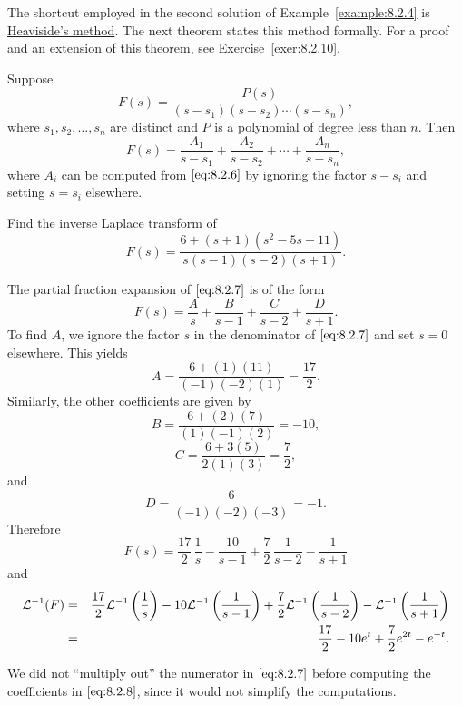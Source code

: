 \documentclass{ximera}
\begin{document}
The shortcut employed in the second solution of
Example~\ref{example:8.2.4} is
\href{https://en.wikipedia.org/wiki/Heaviside_cover-up_method}{Heaviside's method}.
The next theorem states this method formally.  For a proof
and an extension of this theorem, see Exercise~\ref{exer:8.2.10}.

\begin{theorem}\label{thmtype:8.2.2}
Suppose
\begin{equation}\label{eq:8.2.6}
F(s)=\frac{P(s)}{(s-s_1)(s-s_2)\cdots(s-s_n)},
\end{equation}
where $s_1, s_2, \dots, s_n$ are distinct  and $P$ is a polynomial of
degree less than $n$.  Then
$$
F(s)=\frac{A_1}{s-s_1}+\frac{A_2}{s-s_2}+\cdots+\frac{A_n}{s-s_n},$$
where $A_i$ can be computed from $\eqref{eq:8.2.6}$
by ignoring the factor $s-s_i$ and setting $s=s_i$ elsewhere.
\end{theorem}

\begin{example}\label{example:8.2.5} Find the inverse Laplace transform
of
\begin{equation}\label{eq:8.2.7}
F(s)=\frac{6+(s+1)(s^2-5s+11)}{s(s-1)(s-2)(s+1)}.
\end{equation}
\begin{explanation}
The partial fraction expansion of $\eqref{eq:8.2.7}$ is of the form
\begin{equation}\label{eq:8.2.8}
F(s)=\frac{A}{s}+\frac{B}{s-1}+\frac{C}{s-2}+\frac{D}{s+1}.
\end{equation}
To find $A$, we ignore the factor $s$ in the denominator of
$\eqref{eq:8.2.7}$ and set $s=0$ elsewhere. This yields
$$
A=\frac{6+(1)(11)}{(-1)(-2)(1)}=\frac{17}{2}.
$$
Similarly, the other coefficients are given by
$$
B=\frac{6+(2)(7)}{(1)(-1)(2)}=-10,
$$
$$
C=\frac{6+3(5)}{2(1)(3)}=\frac{7}{2},
$$
and
$$
D=\frac{6}{(-1)(-2)(-3)}=-1.
$$
Therefore
$$
F(s)=\frac{17}{2}\,\frac{1}{s}-\frac{10}{s-1}+\frac{7}{2}\,\frac{1}{s-2}-\frac{1}{s+1}
$$
and
\begin{eqnarray*}
{\cal L}^{-1}(F)&=&
 \frac{17}{2}{\cal L}^{-1}\left(\frac{1}{s}\right)-10{\cal L}^{-1}\left(\frac{1}{s-1}\right)+\frac{7}{2}{\cal L}^{-1}\left(\frac{1}{s-2}\right)-{\cal L}^{-1}\left(\frac{1}{s+1}\right)\\
&=& \frac{17}{2}-10e^t+\frac{7}{2}e^{2t}-e^{-t}.
\end{eqnarray*}
\end{explanation}
\end{example}

\begin{remark}
We did not ``multiply out'' the numerator in
$\eqref{eq:8.2.7}$ before
computing the coefficients in $\eqref{eq:8.2.8}$, since
 it would not simplify the computations.
\end{remark}
\end{document}
